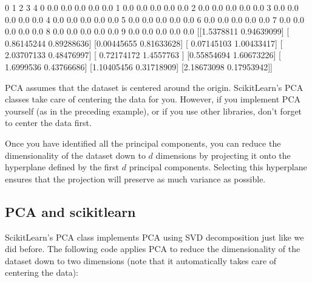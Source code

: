 \documentclass[letterpaper,10pt,english]{sphinxmanual}
\begin{document}
\begin{sphinxVerbatim}[commandchars=\\\{\}]
     0    1    2    3    4
0  0.0  0.0  0.0  0.0  0.0
1  0.0  0.0  0.0  0.0  0.0
2  0.0  0.0  0.0  0.0  0.0
3  0.0  0.0  0.0  0.0  0.0
4  0.0  0.0  0.0  0.0  0.0
5  0.0  0.0  0.0  0.0  0.0
6  0.0  0.0  0.0  0.0  0.0
7  0.0  0.0  0.0  0.0  0.0
8  0.0  0.0  0.0  0.0  0.0
9  0.0  0.0  0.0  0.0  0.0
[[\PYGZhy{}1.5378811  \PYGZhy{}0.94639099]
 [ 0.86145244  0.89288636]
 [\PYGZhy{}0.00445655  0.81633628]
 [ 0.07145103 \PYGZhy{}1.00433417]
 [ 2.03707133 \PYGZhy{}0.48476997]
 [ 0.72174172 \PYGZhy{}1.4557763 ]
 [\PYGZhy{}0.55854694  1.60673226]
 [ 1.6999536   0.43766686]
 [\PYGZhy{}1.10405456  0.31718909]
 [\PYGZhy{}2.18673098 \PYGZhy{}0.17953942]]
\end{sphinxVerbatim}

PCA assumes that the dataset is centered around the origin. Scikit\sphinxhyphen{}Learn’s PCA classes take care of centering
the data for you. However, if you implement PCA yourself (as in the preceding example), or if you use other libraries, don’t
forget to center the data first.

Once you have identified all the principal components, you can reduce the dimensionality of the dataset
down to \(d\) dimensions by projecting it onto the hyperplane defined by the first \(d\) principal components.
Selecting this hyperplane ensures that the projection will preserve as much variance as possible.

\begin{sphinxVerbatim}[commandchars=\\\{\}]
  \PYG{p}{[} \PYG{p}{]}
  
\end{sphinxVerbatim}


\subsection{PCA and scikit\sphinxhyphen{}learn}
\label{\detokenize{chapter8:pca-and-scikit-learn}}
Scikit\sphinxhyphen{}Learn’s PCA class implements PCA using SVD decomposition just like we did before. The
following code applies PCA to reduce the dimensionality of the dataset down to two dimensions (note
that it automatically takes care of centering the data):

\begin{sphinxVerbatim}[commandchars=\\\{\}]
   
    
  
\end{sphinxVerbatim}
\end{document}
